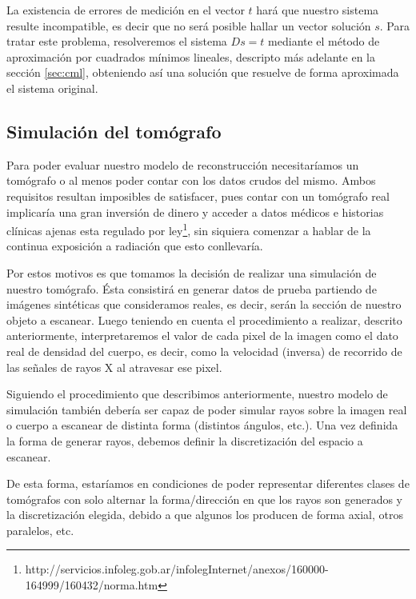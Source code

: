 La existencia de errores de medición en el vector $t$ hará que nuestro sistema resulte incompatible, 
es decir que no será posible hallar un vector solución $s$. Para tratar este problema,
resolveremos el sistema $Ds = t$ mediante el método de aproximación por cuadrados mínimos lineales, descripto más adelante en la sección \ref{sec:cml}, obteniendo así una solución que resuelve de forma aproximada el sistema original.


\subsection{Simulación del tomógrafo}

Para poder evaluar nuestro modelo de reconstrucción necesitaríamos un tomógrafo
o al menos poder contar con los datos crudos del mismo.
Ambos requisitos resultan imposibles de satisfacer,
pues contar con un tomógrafo real implicaría una gran inversión de dinero
y acceder a datos médicos e historias clínicas ajenas esta regulado por ley\footnote{http://servicios.infoleg.gob.ar/infolegInternet/anexos/160000-164999/160432/norma.htm},
sin siquiera comenzar a hablar de la continua exposición a radiación que esto conllevaría.

Por estos motivos es que tomamos la decisión de realizar una simulación de nuestro tomógrafo.
Ésta consistirá en generar datos de prueba partiendo de imágenes sintéticas que consideramos reales,
es decir, serán la sección de nuestro objeto a escanear.
Luego teniendo en cuenta el procedimiento a realizar, descrito anteriormente,
interpretaremos el valor de cada pixel de la imagen como el dato real de densidad del cuerpo,
es decir, como la velocidad (inversa) de recorrido de las señales de rayos X al atravesar ese pixel.

Siguiendo el procedimiento que describimos anteriormente, nuestro modelo de simulación
también debería ser capaz de poder simular rayos sobre la imagen real o cuerpo a escanear
de distinta forma (distintos ángulos, etc.).
Una vez definida la forma de generar rayos, debemos definir la discretización del espacio a escanear.

De esta forma, estaríamos en condiciones de poder representar diferentes clases de tomógrafos
con solo alternar la forma/dirección en que los rayos son generados y la discretización elegida,
debido a que algunos los producen de forma axial, otros paralelos, etc.

